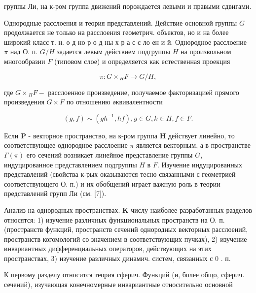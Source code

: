 \documentclass[10pt]{article}
\begin{document}
группы Ли, на к-ром группа движений порождается левыми и правыми сдвигами.



Однородные расслоения и теория представлений. Действие основной группы $G$ продолжается не только на расслоения геометрич. объектов, но и на более широкий класс т. н. о д но р о д ны х р а с с ло ен и й. Однородное расслоение $\pi$ над О. п. $G / H$ задается левым действием подгруппы $H$ на произвольном многообразии $F$ (типовом слое) и определяется как естественная проекция



\[

\pi: G \times{ }_{H} F \longrightarrow G / H,

\]



где $G \times{ }_{H} F-$ расслоенное произведение, получаемое факторизацией прямого произведения $G \times F$ по отношению әквивалентности



\[

(g, f) \sim\left(g h^{-1}, h f\right), g \in G, k \in H, f \in F .

\]



Если $\boldsymbol{P}$ - векторное пространство, на к-ром группа $\boldsymbol{H}$ действует линейно, то соответствующее однородное расслоение $\pi$ является векторным, а в пространстве $\Gamma(\pi)$ его сечений возникает линейное представление группы $G$, индуцированное представлением подгруппы $H$ в $F$. Изучение индуцированных представлений (свойства к-рых оказываются тесно связанными с геометрией соответствующего О. п.) и их обобщений играет важную роль в теории представлений групп Ли (см. [7]).



Анализ на однородных пространствах. $\boldsymbol{K}$ числу наиболее разработанных разделов относятся: 1) изучение различных функциональных пространств на О. п. (пространств функций, пространств сечений однородных векторных расслоений, пространств когомологий со значением в соответствующих пучках), 2) изучение инвариантных дифференциальных операторов, действующих на этих пространствах, 3) изучение различных динамич. систем, связанных с 0 . п.



К первому разделу относится теория сферич. Функций (и, более общо, сферич. сечений), изучающая конечномерные инвариантные относительно основной
\end{document}
